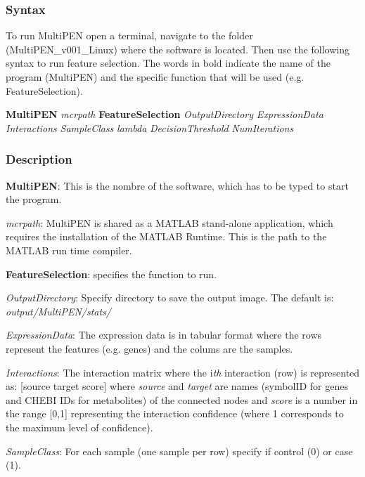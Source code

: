 \documentclass[11pt, oneside]{article}   	%
\begin{document}
\subsubsection{Syntax}



To run MultiPEN open a terminal, navigate to the folder (MultiPEN\_v001\_Linux) where the software is located. Then use the following syntax to run feature selection. The words in bold indicate the name of the program (MultiPEN) and the specific function that will be used (e.g. FeatureSelection).

\begin{framed}
{\bf MultiPEN} {\it mcrpath }  {\bf FeatureSelection } {\it OutputDirectory} 
{\it ExpressionData } {\it Interactions } {\it SampleClass } {\it lambda } 
{\it DecisionThreshold } {\it NumIterations}
\end{framed}


\subsubsection{Description}


{\bf MultiPEN}:  This is the nombre of the software, which has to be typed to start the program.

{\it mcrpath}: MultiPEN is shared as a MATLAB stand-alone application, which requires the installation of the MATLAB Runtime. This is the path to the MATLAB run time compiler.

{\bf FeatureSelection}: specifies the function to run.

{\it OutputDirectory}:  Specify directory to save the output image. The default is: {\it output/MultiPEN/stats/} 

{\it ExpressionData}: The expression data is in tabular format where the rows represent the features (e.g. genes) and the colums are the samples.

{\it Interactions}: The interaction matrix where the i{\it th} interaction (row) is represented as: [source target score] where {\it source} and {\it target} are names (symbolID for genes and CHEBI IDs for metabolites) of the connected nodes and {\it score} is a number in the range [0,1] representing the interaction confidence (where 1 corresponds to the maximum level of confidence).

{\it SampleClass}: For each sample (one sample per row) specify if control (0) or case (1).
\end{document}
